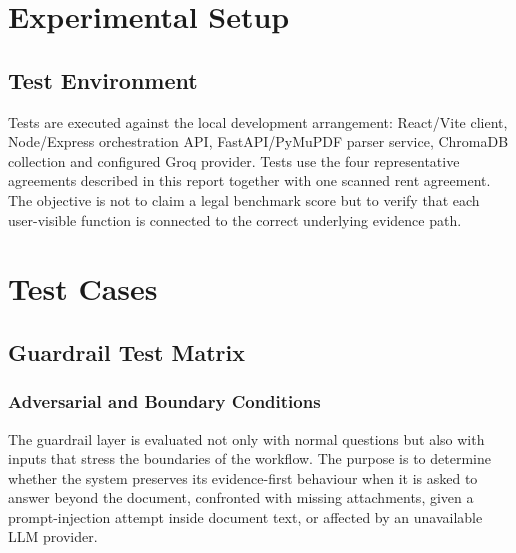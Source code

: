 \documentclass[12pt,a4paper,oneside]{report}
\begin{document}
\section{Experimental Setup}
\subsection{Test Environment}
Tests are executed against the local development arrangement: React/Vite client, Node/Express orchestration API, FastAPI/PyMuPDF parser service, ChromaDB collection and configured Groq provider. Tests use the four representative agreements described in this report together with one scanned rent agreement. The objective is not to claim a legal benchmark score but to verify that each user-visible function is connected to the correct underlying evidence path.

\section{Test Cases}
\subsection{Guardrail Test Matrix}

\subsubsection{Adversarial and Boundary Conditions}
The guardrail layer is evaluated not only with normal questions but also with inputs that stress the boundaries of the workflow. The purpose is to determine whether the system preserves its evidence-first behaviour when it is asked to answer beyond the document, confronted with missing attachments, given a prompt-injection attempt inside document text, or affected by an unavailable LLM provider.
\end{document}
